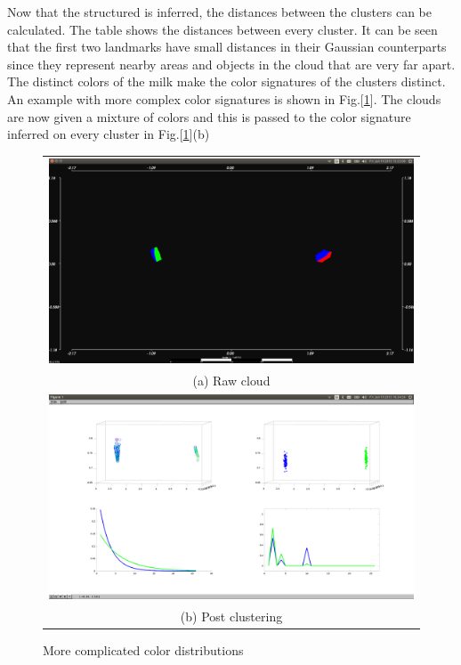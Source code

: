 \documentclass[twoside,hidelinks]{article}
\begin{document}
Now that the structured is inferred, the distances between the clusters can be calculated. The table shows the distances between every cluster. It can be seen that the first two landmarks have small distances in their Gaussian counterparts since they represent nearby areas and objects in the cloud that are very far apart. The distinct colors of the milk make the color signatures of the clusters distinct. An example with more complex color signatures is shown in Fig.[\ref{pcl:clust2}]. The clouds are now given a mixture of colors and this is passed to the color signature inferred on every cluster in Fig.[\ref{pcl:clust2}](b)



\begin{figure}
\begin{tabular}{c}
  \includegraphics[width=1\textwidth]{clusterings/coloursSource} \\
  (a) Raw cloud  \\
   \includegraphics[width=1\textwidth]{clusterings/coloursCorrect} \\
 (b) Post clustering \\[6pt]
\end{tabular}
\caption{More complicated color distributions}
  \label{pcl:clust2}
\end{figure}
\end{document}
